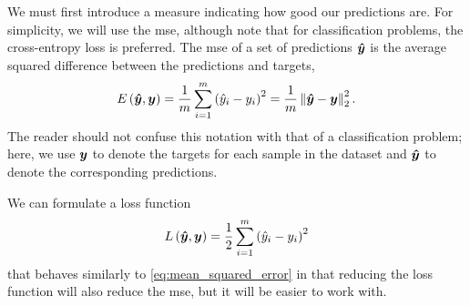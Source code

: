\documentclass[../main.tex]{subfiles}
\begin{document}
We must first introduce a measure indicating how good our predictions are.
For simplicity, we will use the \gls{mse}, although note that for classification problems, the cross-entropy loss is preferred.
The \gls{mse} of a set of predictions ${\bm{\hat{y}}}$ is the average squared difference between the predictions and targets,
\begin{equation}
    \label{eq:mean_squared_error}
    E\left( {\bm{\hat{y}}}, {\bm{y}} \right) = \frac{1}{m} \sum_{i=1}^m{\left(\hat{y}_i - y_i\right)^2} = \frac{1}{m} \left\lVert{\bm{\hat{y}}}-{\bm{y}}\right\rVert_2^2.
\end{equation}
The reader should not confuse this notation with that of a classification problem; here, we use ${\bm{y}}$ to denote the targets for each sample in the dataset and ${\bm{\hat{y}}}$ to denote the corresponding predictions.

We can formulate a loss function
\begin{equation}
    \label{eq:mse}
    L\left( {\bm{\hat{y}}}, {\bm{y}} \right) = \frac{1}{2} \sum_{i=1}^m{\left(\hat{y}_i - y_i\right)^2}
\end{equation}
that behaves similarly to \cref{eq:mean_squared_error} in that reducing the loss function will also reduce the \gls{mse}, but it will be easier to work with.
\end{document}
